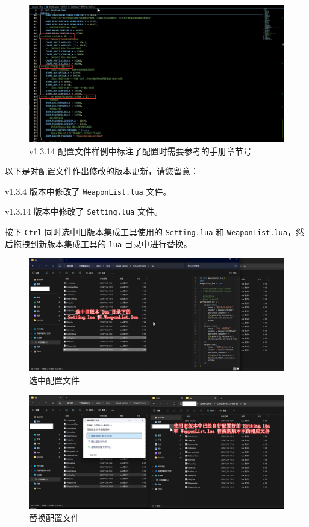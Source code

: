 \begin{figure}[H]
    \Centering
    \includegraphics[width=\textwidth]{docs/assets/update/section_number_in_conf.png}
    \caption{v1.3.14 配置文件样例中标注了配置时需要参考的手册章节号}
    \label{ch5fig-section-number-in-conf}
\end{figure}

以下是对配置文件作出修改的版本更新，请您留意：

v1.3.4 版本中修改了 \lstinline{WeaponList.lua} 文件。

v1.3.14 版本中修改了 \lstinline{Setting.lua} 文件。

按下 \lstinline{Ctrl} 同时选中旧版本集成工具使用的 \lstinline{Setting.lua} 和 \lstinline{WeaponList.lua}，然后拖拽到新版本集成工具的 \lstinline{lua} 目录中进行替换。

\begin{figure}[H]
    \Centering
    \includegraphics[width=\textwidth]{docs/assets/update/replace_01.png}
    \caption{选中配置文件}
\end{figure}

\begin{figure}[H]
    \Centering
    \includegraphics[width=\textwidth]{docs/assets/update/replace_02.png}
    \caption{替换配置文件}
\end{figure}

